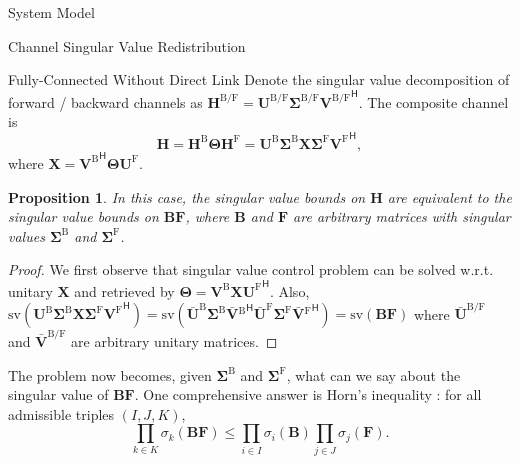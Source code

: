 \documentclass[journal]{IEEEtran}
\newtheorem{proposition}{Proposition}
\begin{document}
\begin{section}{System Model}
\begin{subsection}{Channel Singular Value Redistribution}
		\begin{subsubsection}{Fully-Connected  Without Direct Link}
			Denote the singular value decomposition of forward / backward channels as $\mathbf{H}^{\mathrm{B}/\mathrm{F}} = \mathbf{U}^{\mathrm{B}/\mathrm{F}} \mathbf{\Sigma}^{\mathrm{B}/\mathrm{F}} {\mathbf{V}^{\mathrm{B}/\mathrm{F}}}^\mathsf{H}$.
			The composite channel is
			\begin{equation}
				\mathbf{H} = \mathbf{H}^\mathrm{B} \mathbf{\Theta} \mathbf{H}^\mathrm{F} = \mathbf{U}^\mathrm{B} \mathbf{\Sigma}^\mathrm{B} \mathbf{X} \mathbf{\Sigma}^\mathrm{F} {\mathbf{V}^\mathrm{F}}^\mathsf{H},
			\end{equation}
			where $\mathbf{X} = {\mathbf{V}^\mathrm{B}}^\mathsf{H} \mathbf{\Theta} \mathbf{U}^\mathrm{F}$.
			\begin{proposition}
				In this case, the singular value bounds on $\mathbf{H}$ are equivalent to the singular value bounds on $\mathbf{BF}$, where $\mathbf{B}$ and $\mathbf{F}$ are arbitrary matrices with singular values $\mathbf{\Sigma}^\mathrm{B}$ and $\mathbf{\Sigma}^\mathrm{F}$.
			\end{proposition}
			\begin{proof}
				We first observe that singular value control problem can be solved w.r.t. unitary $\mathbf{X}$ and retrieved by $\mathbf{\Theta} = \mathbf{V}^\mathrm{B} \mathbf{X} {\mathbf{U}^\mathrm{F}}^\mathsf{H}$.
				Also, $\mathrm{sv}(\mathbf{U}^\mathrm{B} \mathbf{\Sigma}^\mathrm{B} \mathbf{X} \mathbf{\Sigma}^\mathrm{F} {\mathbf{V}^\mathrm{F}}^\mathsf{H}) = \mathrm{sv}(\bar{\mathbf{U}}^\mathrm{B} \mathbf{\Sigma}^\mathrm{B} \mathbf{\bar{V}}{{}^\mathrm{B}}^\mathsf{H} \bar{\mathbf{U}}^\mathrm{F} \mathbf{\Sigma}^\mathrm{F} \mathbf{\bar{V}}{{}^\mathrm{F}}^\mathsf{H}) = \mathrm{sv}(\mathbf{BF})$ where $\bar{\mathbf{U}}^{\mathrm{B}/\mathrm{F}}$ and $\bar{\mathbf{V}}^{\mathrm{B}/\mathrm{F}}$ are arbitrary unitary matrices.
			\end{proof}
			The problem now becomes, given $\mathbf{\Sigma}^\mathrm{B}$ and $\mathbf{\Sigma}^\mathrm{F}$, what can we say about the singular value of $\mathbf{BF}$.
			One comprehensive answer is Horn's inequality \cite{Bhatia2001}: for all admissible triples $(I, J, K)$,
			\begin{equation}
				\prod_{k \in {K}} \sigma_k(\mathbf{BF}) \leq \prod_{i \in {I}} \sigma_i(\mathbf{B}) \prod_{j \in {J}} \sigma_j(\mathbf{F}).

\end{equation}
\end{subsubsection}
\end{subsection}
\end{section}
\end{document}
